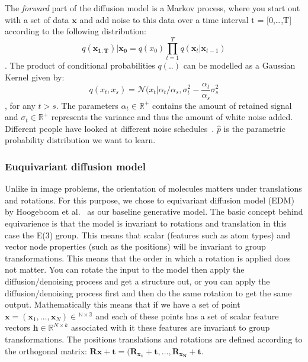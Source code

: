 \documentclass[journal=jacsat,manuscript=article]{achemso}
\begin{document}
The \textit{forward} part of the diffusion model is a Markov process, where you start out with a set of data $\mathbf{x}$ and add noise to this data over a time interval t = [0,\ldots,T] according to the following distribution:
\begin{equation}
  q(\mathbf{x_{1:T}})|\mathbf{x_0} = q(x_0)\prod_{t=1}^T q(\mathbf{x}_t|\mathbf{x}_{t-1})
\end{equation}.
The product of conditional probabilities $q(..)$ can be modelled as a Gaussian Kernel given by:
\begin{equation}
    q(x_t, x_s)=\mathcal{N}(x_t|\alpha_t/\alpha_s, \sigma_t^2-\frac{\alpha_t}{\alpha_s}\sigma^2_s
\end{equation},
for any $t>s$. The parameters $\alpha_t \in \mathbb{R}^{+}$ contains the amount of retained signal and $\sigma_t \in \mathbb{R}^+$ represents the variance and thus the amount of white noise added. 
Different people have looked at different noise schedules~\cite{sohl-dickstein2015deep, ho2020denoising}.
$\hat{p}$ is the parametric probability distribution we want to learn. 
\subsubsection*{Euquivariant diffusion model}
Unlike in image problems, the orientation of molecules matters under translations and rotations. For this purpose, we chose to equivariant diffusion model (EDM) by Hoogeboom et al.~\cite{} as our baseline generative model. The basic concept behind equivarience is that the model is invariant to rotations and translation in this case the E(3) group. This means that scalar (features such as atom types) and vector node properties (such as the positions) will be invariant to group transformations. This means that the order in which a rotation is applied does not matter. You can rotate the input to the model then apply the diffusion/denoising process and get a structure out, or you can apply the diffusion/denoising process first and then do the same rotation to get the same output. 
Mathematically this means that if we have a set of point $\mathbf{x} = (\mathbf{x}_1,\ldots,\mathbf{x}_N) \in \mathbb{^{N\times 3}}$ and each of these points has a set of scalar feature vectors $\mathbf{h}\in \mathbb{R}^{N\times k}$ associated with it these features are invariant to group transformations. The positions translations and rotations are defined according to the orthogonal matrix: $\mathbf{Rx + t} = (\mathbf{R_{x_1}+t},\ldots, \mathbf{R_{x_N}+t}$.
\end{document}
